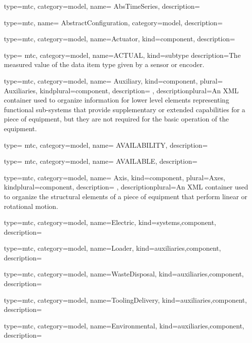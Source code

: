 

{
  type=mtc,
  category=model,
  name= {AbsTimeSeries},
  description= {}
}


{
  type=mtc,
  name= {AbstractConfiguration},
  category=model,
  description= {}
}

{
  type=mtc,
  category=model,
  name={Actuator},
  kind={component},
  description={}
}

{
  type= mtc,
  category=model,
  name={ACTUAL},
  kind={subtype}
  description={The measured value of the data item type given by a sensor or encoder.}
}

{
  type=mtc,
  category=model,
  name= {Auxiliary},
  kind={component},
  plural= {Auxiliaries},
  kindplural={component},
  description= {},
  descriptionplural={An XML container used to organize information for \gls{lower level} elements representing functional sub-systems that provide supplementary or extended capabilities for a piece of equipment, but they are not required for the basic operation of the equipment.}
}


{
  type= mtc,
  category=model,
  name= {AVAILABILITY},
  description= {}
}


{
  type= mtc,
  category=model,
  name= {AVAILABLE},
  description= {}
}


{
  type=mtc,
  category=model,
  name= {Axis},
  kind={component},
  plural={Axes},
  kindplural={component},
  description= {},
  descriptionplural={An XML container used to organize the \glspl{structural element} of a piece of equipment that perform linear or rotational motion.}
}


{
  type=mtc,
  category=model,
  name={Electric},
  kind={systems,component},
  description={}
}


{
  type=mtc,
  category=model,
  name={Loader},
  kind={auxiliaries,component},
  description={}
}


{
  type=mtc,
  category=model,
  name={WasteDisposal},
  kind={auxiliaries,component},
  description={}
}


{
  type=mtc,
  category=model,
  name={ToolingDelivery},
  kind={auxiliaries,component},
  description={}
}


{
  type=mtc,
  category=model,
  name={Environmental},
  kind={auxiliaries,component},
  description={}
}


